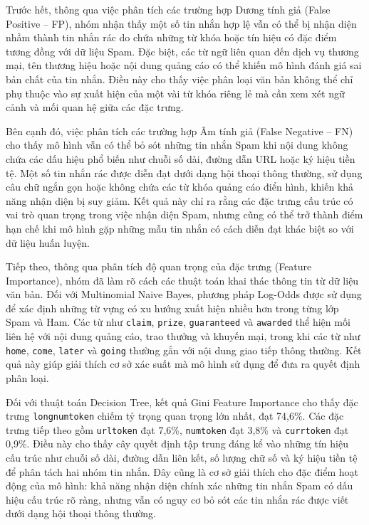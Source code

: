 Trước hết, thông qua việc phân tích các trường hợp Dương tính giả (False Positive -- FP), nhóm nhận thấy một số tin nhắn hợp lệ vẫn có thể bị nhận diện nhầm thành tin nhắn rác do chứa những từ khóa hoặc tín hiệu có đặc điểm tương đồng với dữ liệu Spam. Đặc biệt, các từ ngữ liên quan đến dịch vụ thương mại, tên thương hiệu hoặc nội dung quảng cáo có thể khiến mô hình đánh giá sai bản chất của tin nhắn. Điều này cho thấy việc phân loại văn bản không thể chỉ phụ thuộc vào sự xuất hiện của một vài từ khóa riêng lẻ mà cần xem xét ngữ cảnh và mối quan hệ giữa các đặc trưng.

Bên cạnh đó, việc phân tích các trường hợp Âm tính giả (False Negative -- FN) cho thấy mô hình vẫn có thể bỏ sót những tin nhắn Spam khi nội dung không chứa các dấu hiệu phổ biến như chuỗi số dài, đường dẫn URL hoặc ký hiệu tiền tệ. Một số tin nhắn rác được diễn đạt dưới dạng hội thoại thông thường, sử dụng câu chữ ngắn gọn hoặc không chứa các từ khóa quảng cáo điển hình, khiến khả năng nhận diện bị suy giảm. Kết quả này chỉ ra rằng các đặc trưng cấu trúc có vai trò quan trọng trong việc nhận diện Spam, nhưng cũng có thể trở thành điểm hạn chế khi mô hình gặp những mẫu tin nhắn có cách diễn đạt khác biệt so với dữ liệu huấn luyện.

Tiếp theo, thông qua phân tích độ quan trọng của đặc trưng (Feature Importance), nhóm đã làm rõ cách các thuật toán khai thác thông tin từ dữ liệu văn bản. Đối với Multinomial Naive Bayes, phương pháp Log-Odds được sử dụng để xác định những từ vựng có xu hướng xuất hiện nhiều hơn trong từng lớp Spam và Ham. Các từ như \texttt{claim}, \texttt{prize}, \texttt{guaranteed} và \texttt{awarded} thể hiện mối liên hệ với nội dung quảng cáo, trao thưởng và khuyến mại, trong khi các từ như \texttt{home}, \texttt{come}, \texttt{later} và \texttt{going} thường gắn với nội dung giao tiếp thông thường. Kết quả này giúp giải thích cơ sở xác suất mà mô hình sử dụng để đưa ra quyết định phân loại.

Đối với thuật toán Decision Tree, kết quả Gini Feature Importance cho thấy đặc trưng \texttt{longnumtoken} chiếm tỷ trọng quan trọng lớn nhất, đạt 74,6\%. Các đặc trưng tiếp theo gồm \texttt{urltoken} đạt 7,6\%, \texttt{numtoken} đạt 3,8\% và \texttt{currtoken} đạt 0,9\%. Điều này cho thấy cây quyết định tập trung đáng kể vào những tín hiệu cấu trúc như chuỗi số dài, đường dẫn liên kết, số lượng chữ số và ký hiệu tiền tệ để phân tách hai nhóm tin nhắn. Đây cũng là cơ sở giải thích cho đặc điểm hoạt động của mô hình: khả năng nhận diện chính xác những tin nhắn Spam có dấu hiệu cấu trúc rõ ràng, nhưng vẫn có nguy cơ bỏ sót các tin nhắn rác được viết dưới dạng hội thoại thông thường.

